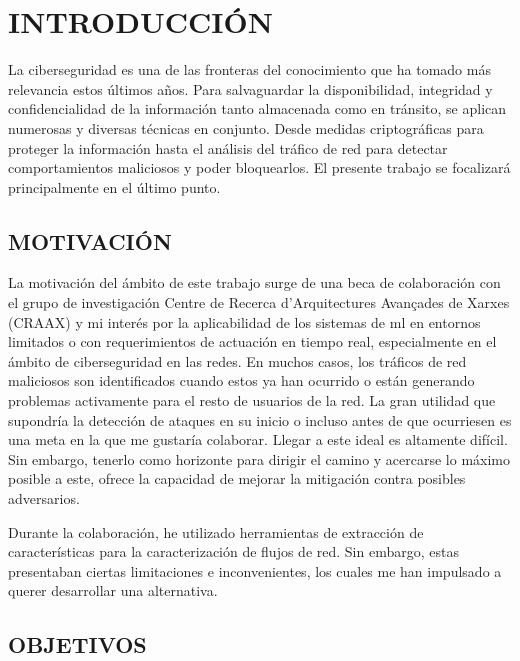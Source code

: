\newpage
\pagestyle{plain}

\chapter*{INTRODUCCIÓN}

La ciberseguridad es una de las fronteras del conocimiento que ha tomado más relevancia estos últimos años. Para salvaguardar la disponibilidad, integridad y confidencialidad de la información tanto almacenada como en tránsito, se aplican numerosas y diversas técnicas en conjunto. Desde medidas criptográficas para proteger la información hasta el análisis del tráfico de red para detectar comportamientos maliciosos y poder bloquearlos. El presente trabajo se focalizará principalmente en el último punto.

\section*{MOTIVACIÓN}

La motivación del ámbito de este trabajo surge de una beca de colaboración con el grupo de investigación Centre de Recerca d'Arquitectures Avançades de Xarxes (CRAAX) y mi interés por la aplicabilidad de los sistemas de \gls{ml} en entornos limitados o con requerimientos de actuación en tiempo real, especialmente en el ámbito de ciberseguridad en las redes. En muchos casos, los tráficos de red maliciosos son identificados cuando estos ya han ocurrido o están generando problemas activamente para el resto de usuarios de la red. La gran utilidad que supondría la detección de ataques en su inicio o incluso antes de que ocurriesen es una meta en la que me gustaría colaborar. Llegar a este ideal es altamente difícil. Sin embargo, tenerlo como horizonte para dirigir el camino y acercarse lo máximo posible a este, ofrece la capacidad de mejorar la mitigación contra posibles adversarios.

Durante la colaboración, he utilizado herramientas de extracción de características para la caracterización de flujos de red. Sin embargo, estas presentaban ciertas limitaciones e inconvenientes, los cuales me han impulsado a querer desarrollar una alternativa.

\section*{OBJETIVOS}

